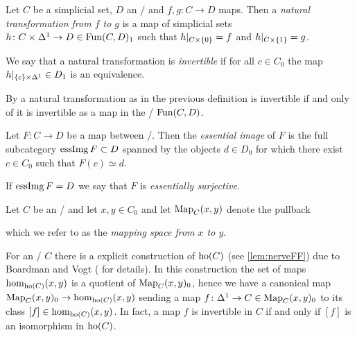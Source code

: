 \begin{definition}
    Let $C$ be a simplicial set, $D$ an \inftycat/ and $f,g\colon C\to D$ maps.
    Then a \emph{natural transformation from $f$ to $g$} is a map of simplicial sets $h\colon C\times\Delta^1\to D\in\operatorname{Fun}(C,D)_1$ such that $h|_{C\times\left\lbrace0\right\rbrace}=f$ and $h|_{C\times\left\lbrace1\right\rbrace}=g$.
    
    We say that a natural transformation is \emph{invertible} if for all $c\in C_0$ the map $h|_{\left\lbrace c\right\rbrace\times\Delta^1}\in D_1$ is an equivalence.
\end{definition}
\begin{remark}
    By \cite[Corollary 3.5.12]{cisinski_2019} a natural transformation as in the previous definition is invertible if and only of it is invertible as a map in the \inftycat/ $\operatorname{Fun}(C,D)$.
\end{remark}
\begin{definition}
    Let $F\colon C\to D$ be a map between \inftycats/.
    Then the \emph{essential image} of $F$ is the full subcategory $\operatorname{essImg} F\subset D$ spanned by the objects $d\in D_0$ for which there exist $c\in C_0$ such that $F(c)\simeq d$.

    If $\operatorname{essImg} F=D$ we say that $F$ is \emph{essentially surjective}.
\end{definition}
\begin{definition}\label{def:mappingSpace}
    Let $C$ be an \inftycat/ and let $x,y\in C_0$ and let $\operatorname{Map}_C(x,y)$ denote the pullback 
    \begin{center}
    \end{center}
    which we refer to as the \emph{mapping space from $x$ to $y$}.
\end{definition}
\begin{remark}\label{rmk:boardmanVogt}
    For an \inftycat/ $C$ there is a explicit construction of $\operatorname{ho}(C)$ (see \cref{lem:nerveFF}) due to Boardman and Vogt (\cite[Theorem 1.6.6]{cisinski_2019} for details).
    In this construction the set of maps $\hom_{\operatorname{ho}(C)}(x,y)$ is a quotient of $\operatorname{Map}_C(x,y)_0$, hence we have a canonical map $\operatorname{Map}_C(x,y)_0\to\hom_{\operatorname{ho}(C)}(x,y)$ sending a map $f\colon\Delta^1\to C\in\operatorname{Map}_C(x,y)_0$ to its class $[f]\in\hom_{\operatorname{ho}(C)}(x,y)$.
    In fact, a map $f$ is invertible in $C$ if and only if $[f]$ is an isomorphism in $\operatorname{ho}(C)$.
\end{remark}
